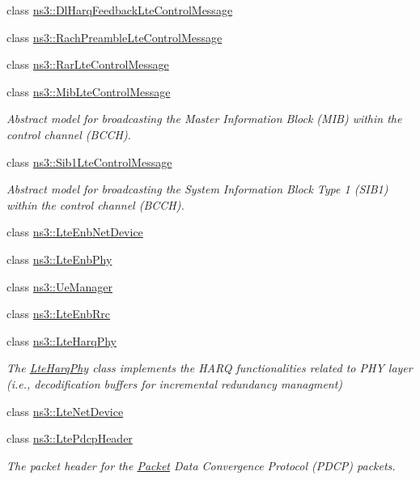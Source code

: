 \begin{DoxyCompactItemize}
\item 
class \hyperlink{classns3_1_1DlHarqFeedbackLteControlMessage}{ns3\+::\+Dl\+Harq\+Feedback\+Lte\+Control\+Message}
\item 
class \hyperlink{classns3_1_1RachPreambleLteControlMessage}{ns3\+::\+Rach\+Preamble\+Lte\+Control\+Message}
\item 
class \hyperlink{classns3_1_1RarLteControlMessage}{ns3\+::\+Rar\+Lte\+Control\+Message}
\item 
class \hyperlink{classns3_1_1MibLteControlMessage}{ns3\+::\+Mib\+Lte\+Control\+Message}
\begin{DoxyCompactList}\small\item\em Abstract model for broadcasting the Master Information Block (M\+IB) within the control channel (B\+C\+CH). \end{DoxyCompactList}\item 
class \hyperlink{classns3_1_1Sib1LteControlMessage}{ns3\+::\+Sib1\+Lte\+Control\+Message}
\begin{DoxyCompactList}\small\item\em Abstract model for broadcasting the System Information Block Type 1 (S\+I\+B1) within the control channel (B\+C\+CH). \end{DoxyCompactList}\item 
class \hyperlink{classns3_1_1LteEnbNetDevice}{ns3\+::\+Lte\+Enb\+Net\+Device}
\item 
class \hyperlink{classns3_1_1LteEnbPhy}{ns3\+::\+Lte\+Enb\+Phy}
\item 
class \hyperlink{classns3_1_1UeManager}{ns3\+::\+Ue\+Manager}
\item 
class \hyperlink{classns3_1_1LteEnbRrc}{ns3\+::\+Lte\+Enb\+Rrc}
\item 
class \hyperlink{classns3_1_1LteHarqPhy}{ns3\+::\+Lte\+Harq\+Phy}
\begin{DoxyCompactList}\small\item\em The \hyperlink{classns3_1_1LteHarqPhy}{Lte\+Harq\+Phy} class implements the H\+A\+RQ functionalities related to P\+HY layer (i.\+e., decodification buffers for incremental redundancy managment) \end{DoxyCompactList}\item 
class \hyperlink{classns3_1_1LteNetDevice}{ns3\+::\+Lte\+Net\+Device}
\item 
class \hyperlink{classns3_1_1LtePdcpHeader}{ns3\+::\+Lte\+Pdcp\+Header}
\begin{DoxyCompactList}\small\item\em The packet header for the \hyperlink{classns3_1_1Packet}{Packet} Data Convergence Protocol (P\+D\+CP) packets. \end{DoxyCompactList}\item 

\end{DoxyCompactItemize}
